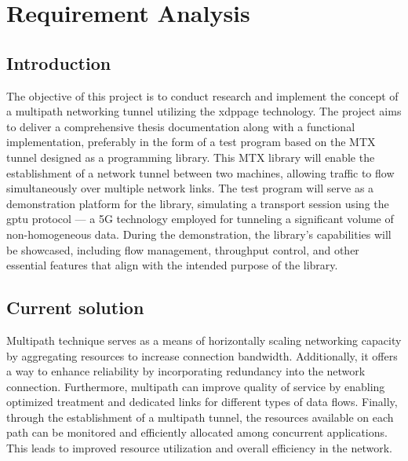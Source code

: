 \chapter{Requirement Analysis}\label{sec:reqs}\minitoc\vspace{.5cm}

\section{Introduction}
The objective of this project is to conduct research and implement the concept of a multipath networking tunnel utilizing the \ac{xdppage} technology. The project aims to deliver a comprehensive thesis documentation along with a functional implementation, preferably in the form of a test program based on the \ac{MTX} tunnel designed as a programming library.
This \ac{MTX} library will enable the establishment of a network tunnel between two machines, allowing traffic to flow simultaneously over multiple network links. 
The test program will serve as a demonstration platform for the library, simulating a transport session using the \ac{gptu} protocol — a 5G technology employed for tunneling a significant volume of non-homogeneous data.
During the demonstration, the library's capabilities will be showcased, including flow management, throughput control, and other essential features that align with the intended purpose of the library.

\section{Current solution}
Multipath technique serves as a means of horizontally scaling networking capacity by aggregating resources to increase connection bandwidth. 
Additionally, it offers a way to enhance reliability by incorporating redundancy into the network connection. Furthermore, multipath can improve quality of service by enabling optimized treatment and dedicated links for different types of data flows.
Finally, through the establishment of a multipath tunnel, the resources available on each path can be monitored and efficiently allocated among concurrent applications. 
This leads to improved resource utilization and overall efficiency in the network.

